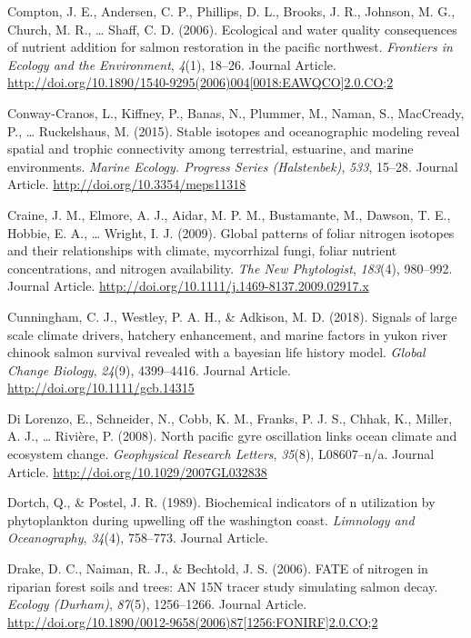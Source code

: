 \documentclass [11pt, proquest] {uwthesis}[2015/03/03]
\begin{document}
\hypertarget{ref-Compton2006}{}
Compton, J. E., Andersen, C. P., Phillips, D. L., Brooks, J. R.,
Johnson, M. G., Church, M. R., \ldots{} Shaff, C. D. (2006). Ecological
and water quality consequences of nutrient addition for salmon
restoration in the pacific northwest. \emph{Frontiers in Ecology and the
Environment}, \emph{4}(1), 18--26. Journal Article.
\href{http://doi.org/10.1890/1540-9295(2006)004\%5B0018:EAWQCO\%5D2.0.CO;2}{http://doi.org/10.1890/1540-9295(2006)004{[}0018:EAWQCO{]}2.0.CO;2}

\hypertarget{ref-Conway2015}{}
Conway-Cranos, L., Kiffney, P., Banas, N., Plummer, M., Naman, S.,
MacCready, P., \ldots{} Ruckelshaus, M. (2015). Stable isotopes and
oceanographic modeling reveal spatial and trophic connectivity among
terrestrial, estuarine, and marine environments. \emph{Marine Ecology.
Progress Series (Halstenbek)}, \emph{533}, 15--28. Journal Article.
\url{http://doi.org/10.3354/meps11318}

\hypertarget{ref-Craine2009}{}
Craine, J. M., Elmore, A. J., Aidar, M. P. M., Bustamante, M., Dawson,
T. E., Hobbie, E. A., \ldots{} Wright, I. J. (2009). Global patterns of
foliar nitrogen isotopes and their relationships with climate,
mycorrhizal fungi, foliar nutrient concentrations, and nitrogen
availability. \emph{The New Phytologist}, \emph{183}(4), 980--992.
Journal Article. \url{http://doi.org/10.1111/j.1469-8137.2009.02917.x}

\hypertarget{ref-Cunningham2018}{}
Cunningham, C. J., Westley, P. A. H., \& Adkison, M. D. (2018). Signals
of large scale climate drivers, hatchery enhancement, and marine factors
in yukon river chinook salmon survival revealed with a bayesian life
history model. \emph{Global Change Biology}, \emph{24}(9), 4399--4416.
Journal Article. \url{http://doi.org/10.1111/gcb.14315}

\hypertarget{ref-DiLorenzo2008}{}
Di Lorenzo, E., Schneider, N., Cobb, K. M., Franks, P. J. S., Chhak, K.,
Miller, A. J., \ldots{} Rivière, P. (2008). North pacific gyre
oscillation links ocean climate and ecosystem change. \emph{Geophysical
Research Letters}, \emph{35}(8), L08607--n/a. Journal Article.
\url{http://doi.org/10.1029/2007GL032838}

\hypertarget{ref-Dortch1989}{}
Dortch, Q., \& Postel, J. R. (1989). Biochemical indicators of n
utilization by phytoplankton during upwelling off the washington coast.
\emph{Limnology and Oceanography}, \emph{34}(4), 758--773. Journal
Article.

\hypertarget{ref-Drake2006}{}
Drake, D. C., Naiman, R. J., \& Bechtold, J. S. (2006). FATE of nitrogen
in riparian forest soils and trees: AN 15N tracer study simulating
salmon decay. \emph{Ecology (Durham)}, \emph{87}(5), 1256--1266. Journal
Article.
\href{http://doi.org/10.1890/0012-9658(2006)87\%5B1256:FONIRF\%5D2.0.CO;2}{http://doi.org/10.1890/0012-9658(2006)87{[}1256:FONIRF{]}2.0.CO;2}
\end{document}
